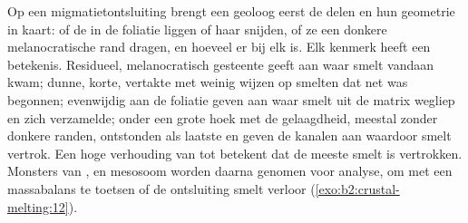 \begin{inthefield}
Op een migmatietontsluiting brengt een geoloog eerst de delen en hun geometrie in kaart: of de
 in de foliatie liggen of haar snijden, of ze een donkere melanocratische rand dragen,
en hoeveel  er bij elk  is. Elk kenmerk heeft een betekenis. Residueel,
melanocratisch gesteente geeft aan waar smelt vandaan kwam; dunne, korte, vertakte  met
weinig  wijzen op smelten dat net was begonnen;  evenwijdig aan de foliatie
geven aan waar smelt uit de matrix wegliep en zich verzamelde;  onder een grote hoek met de
gelaagdheid, meestal zonder donkere randen, ontstonden als laatste en geven de kanalen aan waardoor
smelt vertrok. Een hoge verhouding van  tot  betekent dat de meeste smelt is vertrokken.
Monsters van ,  en mesosoom worden daarna genomen voor analyse, om met een
massabalans te toetsen of de ontsluiting smelt verloor (\cref{exo:b2:crustal-melting:12}).
\end{inthefield}

